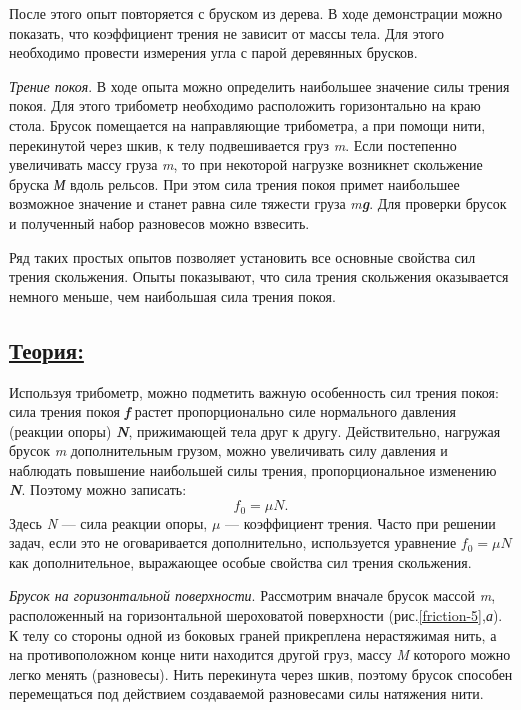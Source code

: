 \documentclass[14pt,a4paper,oneside]{extarticle}	%
\begin{document}
	После этого опыт повторяется с бруском из дерева.
	В ходе демонстрации можно показать, что коэффициент трения не зависит от массы тела.
	Для этого необходимо провести измерения угла с парой деревянных брусков.
	
	\textit{Трение покоя}.	
    В ходе опыта можно определить наибольшее значение силы трения покоя.
    Для этого трибометр необходимо расположить горизонтально на краю стола.
    Брусок помещается на направляющие трибометра, а при помощи нити, перекинутой через шкив, к телу подвешивается груз \textit{m}.
	Если постепенно увеличивать массу груза \textit{m}, то при некоторой нагрузке возникнет скольжение бруска \textit{М} вдоль рельсов. 
	При этом сила трения покоя примет наибольшее возможное значение и станет равна 
	силе тяжести груза \textit{m\textbf{g}}.
	Для проверки брусок и полученный набор разновесов можно взвесить.
	
	Ряд таких простых опытов позволяет установить все основные 
	свойства сил трения скольжения. 
	Опыты показывают, что сила трения скольжения оказывается немного меньше, чем наибольшая 
	сила трения покоя. 

	\newpage	
	\subsection*{\underline{Теория:}}
	
	Используя трибометр, можно подметить важную особенность сил трения покоя: сила трения покоя \textit{\textbf{f}} растет пропорционально силе нормального давления (реакции опоры)
	\textit{\textbf{N}}, прижимающей тела друг к другу. 
	Действительно, нагружая брусок \textit{m} дополнительным грузом, можно увеличивать 
	силу давления и наблюдать повышение наибольшей силы трения, пропорциональное изменению \textit{\textbf{N}}. 
	Поэтому можно записать: 
	\begin{equation}\label{friction-4eq1}
	f_0  = \mu N.
	\end{equation}
	Здесь \textit{N} — сила реакции опоры, $ \mu $ — коэффициент трения.
	Часто при решении задач, если это не оговаривается дополнительно, используется уравнение $ f_0 = \mu N $ как дополнительное, выражающее особые свойства сил трения скольжения. 

\textit{Брусок на горизонтальной поверхности}.
Рассмотрим вначале брусок массой \textit{m}, расположенный на горизонтальной шероховатой поверхности (рис.\ref{friction-5},\textit{а}).
К телу со стороны одной из боковых граней прикреплена нерастяжимая нить, а на противоположном конце нити находится другой груз, массу \textit{M} которого можно легко менять (разновесы).
Нить перекинута через шкив, поэтому брусок способен перемещаться под действием создаваемой разновесами силы натяжения нити.
\end{document}
